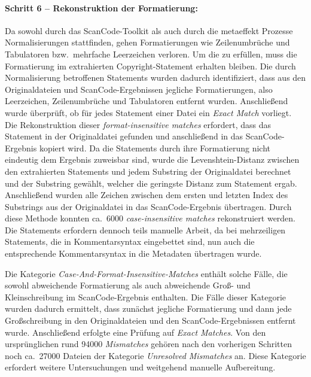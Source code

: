 \paragraph{Schritt 6 -- Rekonstruktion der Formatierung:}
Da sowohl durch das ScanCode-Toolkit als auch durch die metaeffekt Prozesse Normalisierungen stattfinden, gehen Formatierungen wie Zeilenumbrüche und Tabulatoren bzw.\ mehrfache Leerzeichen verloren.
Um die  zu erfüllen, muss die Formatierung im extrahierten Copyright-Statement erhalten bleiben.
Die durch Normalisierung betroffenen Statements wurden dadurch identifiziert, dass aus den Originaldateien und ScanCode-Ergebnissen jegliche Formatierungen, also Leerzeichen, Zeilenumbrüche und Tabulatoren entfernt wurden.
Anschließend wurde überprüft, ob für jedes Statement einer Datei ein \textit{Exact Match} vorliegt.
Die Rekonstruktion dieser \textit{format-insensitive matches} erfordert, dass das Statement in der Originaldatei gefunden und anschließend in das ScanCode-Ergebnis kopiert wird.
Da die Statements durch ihre Formatierung nicht eindeutig dem Ergebnis zuweisbar sind, wurde die Levenshtein-Distanz zwischen den extrahierten Statements und jedem Substring der Originaldatei berechnet und der Substring gewählt, welcher die geringste Distanz zum Statement ergab.
Anschließend wurden alle Zeichen zwischen dem ersten und letzten Index des Substrings aus der Originaldatei in das ScanCode-Ergebnis übertragen.
Durch diese Methode konnten ca.\ \num{6000} \textit{case-insensitive matches} rekonstruiert werden.
Die Statements erfordern dennoch teils manuelle Arbeit, da bei mehrzeiligen Statements, die in Kommentarsyntax eingebettet sind, nun auch die entsprechende Kommentarsyntax in die Metadaten übertragen wurde.

Die Kategorie \textit{Case-And-Format-Insensitive-Matches} enthält solche Fälle, die sowohl abweichende Formatierung als auch abweichende Groß- und Kleinschreibung im ScanCode-Ergebnis enthalten.
Die Fälle dieser Kategorie wurden dadurch ermittelt, dass zunächst jegliche Formatierung und dann jede Großschreibung in den Originaldateien und den ScanCode-Ergebnissen entfernt wurde.
Anschließend erfolgte eine Prüfung auf \textit{Exact Matches}.
Von den ursprünglichen rund \num{94000} \textit{Mismatches} gehören nach den vorherigen Schritten noch ca.\ \num{27000} Dateien der Kategorie \textit{Unresolved Mismatches} an.
Diese Kategorie erfordert weitere Untersuchungen und weitgehend manuelle Aufbereitung.

